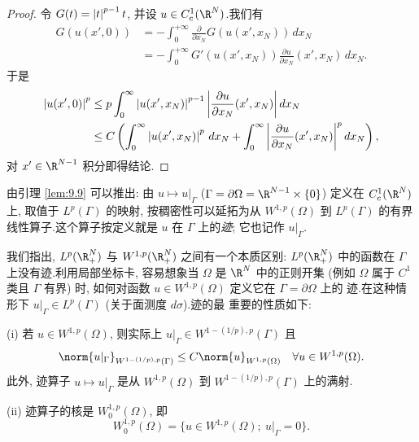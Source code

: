 \begin{proof}
令 $G(t)=\left|t\right|^{p-1}t$, 并设 $u\in C_c^1(\R^N)$.我们有
\begin{equation*}
\begin{aligned}
G(u(x',0))&=-\int_0^{+\infty}\frac{\partial}{\partial x_N}
G(u(x',x_N))\,dx_N\\
&=-\int_0^{+\infty}G'(u(x',x_N))
\frac{\partial u}{\partial x_N}(x',x_N)\,dx_N.
\end{aligned}
\end{equation*}
于是
\begin{equation*}
\begin{aligned}
\left|u(x',0)\right|^p
&\le p\int_0^\infty\left|u(x',x_N)\right|^{p-1}
\left|\frac{\partial u}{\partial x_N}(x',x_N)\right|dx_N\\
&\le C\left(\int_0^\infty\left|u(x',x_N)\right|^p\,dx_N
+\int_0^\infty\left|\frac{\partial u}{\partial x_N}(x',x_N)\right|^p
dx_N\right),
\end{aligned}
\end{equation*}
对 $x'\in\R^{N-1}$ 积分即得结论.
\end{proof}

由引理  \ref{lem:9.9} 可以推出: 由
$u\mapsto u|_\Gamma$ ($\Gamma=\partial\Omega=\R^{N-1}\times\{0\}$) 定义在
$C_c^1(\R^N)$ 上, 取值于 $L^p(\Gamma)$ 的映射, 按稠密性可以延拓为从
$W^{1,p}(\Omega)$ 到 $L^p(\Gamma)$ 的有界线性算子.这个算子按定义就是 $u$ 在
$\Gamma$ 上的\emph{迹}; 它也记作 $u|_\Gamma$.

我们指出, $L^p(\R^N_+)$ 与 $W^{1,p}(\R^N_+)$ 之间有一个本质区别:
$L^p(\R^N_+)$ 中的函数在 $\Gamma$ 上没有迹.利用局部坐标卡, 容易想象当
$\Omega$ 是 $\R^N$ 中的正则开集 (例如 $\Omega$ 属于 $C^1$ 类且 $\Gamma$ 有界)
时, 如何对函数 $u\in W^{1,p}(\Omega)$ 定义它在 $\Gamma=\partial\Omega$ 上的
迹.在这种情形下 $u|_\Gamma\in L^p(\Gamma)$ (关于面测度 $d\sigma$).迹的最
重要的性质如下:

\noindent (i) 若 $u\in W^{1,p}(\Omega)$, 则实际上
$u|_\Gamma\in W^{1-(1/p),p}(\Gamma)$ 且
\begin{equation*}
\norm{u|_\Gamma}_{W^{1-(1/p),p}(\Gamma)}\le C\norm{u}_{W^{1,p}(\Omega)}
\quad\forall u\in W^{1,p}(\Omega).
\end{equation*}
此外, 
迹算子 $u\mapsto u|_\Gamma$ 是从 $W^{1,p}(\Omega)$ 到
$W^{1-(1/p),p}(\Gamma)$ 上的满射.

\noindent (ii) 迹算子的核是 $W_0^{1,p}(\Omega)$, 即
\begin{equation*}
W_0^{1,p}(\Omega)=\{u\in W^{1,p}(\Omega);\ u|_\Gamma=0\}.
\end{equation*}

